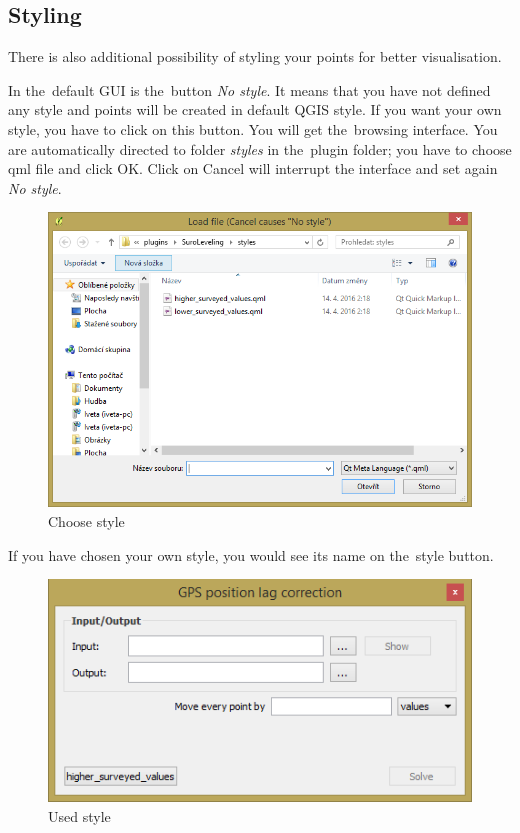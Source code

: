 \subsection{Styling}
\label{styling}

There is also additional possibility of styling your points for better visualisation. 

In the~default GUI is the~button \textit{No style}. It means that you have not defined any style
and points will be created in default QGIS style. If you want your own style, you have to click on
this button. You will get the~browsing interface. You are automatically directed to folder
\textit{styles} in the~plugin folder; you have to choose qml file and click OK. Click on Cancel will
interrupt the interface and set again \textit{No style}. 

  \begin{figure}[H]
   \centering
	\includegraphics[scale=0.75]{./pictures/style.png}
	\caption[Choose style]{Choose style}
      \label{fig:style}
  \end{figure}

If you have chosen your own style, you would see its name on the~style button. 

  \begin{figure}[H]
   \centering
	\includegraphics[scale=0.75]{./pictures/style-defined.png}
	\caption[Used style]{Used style}
      \label{fig:used-style}
  \end{figure}

